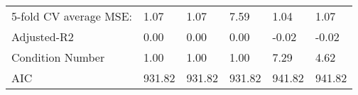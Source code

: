 \begin{table}
\begin{center}
\begin{tabular}{llllll}
5-fold CV average MSE:                         & 1.07   & 1.07   & 7.59   & 1.04    & 1.07      \\
Adjusted-R2                                    & 0.00   & 0.00   & 0.00   & -0.02   & -0.02     \\
Condition Number                               & 1.00   & 1.00   & 1.00   & 7.29    & 4.62      \\
AIC                                            & 931.82 & 931.82 & 931.82 & 941.82  & 941.82    \\
\hline
\end{tabular}
\end{center}
\end{table}